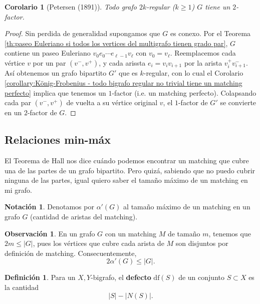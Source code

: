 \documentclass[12pt]{report}
\theoremstyle{plain}
\newtheorem{corollary}[theorem]{Corolario}
\theoremstyle{definition}
\newtheorem{definition}[theorem]{Definición}
\newtheorem{obs}[theorem]{Observación}
\newtheorem{notation}[theorem]{Notación}
\newcommand{\abs}[1]{\left \vert #1 \right \vert}
\newcommand{\defecto}[1]{\mathrm{df}(#1)}
\begin{document}
\begin{corollary}[Petersen (1891)]
Todo grafo $2k$-regular ($k \geq 1$) $G$ tiene un $2$-factor.
\end{corollary}
\begin{proof}
Sin perdida de generalidad supongamos que $G$ es conexo. Por el Teorema \ref{th:paseo Euleriano si todos los vertices del multigrafo tienen grado par}, $G$ contiene un paseo Euleriano $v_0 e_0 \cdots e_{\ell -1} v_\ell$ con $v_0 = v_\ell$. Reemplacemos cada vértice $v$ por un par $(v^- , v^+)$, y cada arissta $e_i = v_i v_{i+1}$ por la arista $v_i^+ v_{i+1}^-$. Así obtenemos un grafo bipartito $G'$ que es $k$-regular, con lo cual el Corolario \ref{corollary:König-Frobenius - todo bigrafo regular no trivial tiene un matching perfecto} implica que tenemos un $1$-factor (i.e. un matching perfecto). Colapsando cada par $(v^-,v^+)$ de vuelta a su vértice original $v$, el $1$-factor de $G'$ se convierte en un $2$-factor de $G$.

\end{proof}

\subsection{Relaciones min-máx}

El Teorema de Hall nos dice cuándo podemos encontrar un matching que cubre una de las partes de un grafo bipartito.
Pero quizá, sabiendo que no puedo cubrir ninguna de las partes, igual quiero saber el tamaño máximo de un matching en
mi grafo.

\begin{notation}
Denotamos por $\alpha ' (G)$ al tamaño máximo de un matching en un grafo $G$ (cantidad de aristas del matching).
\end{notation}

\begin{obs}
En un grafo $G$ con un matching $M$ de tamaño $m$, tenemos que $2 m \leq \abs G$, pues los vértices que cubre cada arista de $M$ son disjuntos por definición de matching. Consecuentemente,
\[
    2 \alpha ' (G) \leq \abs G.
\]
\end{obs}

\begin{definition}
Para un $X,Y$-bigrafo, el \textbf{defecto} $\defecto{S}$ de un conjunto $S \subset X$ es la cantidad
\[
    \abs S - \abs{N(S)}.
\]
\end{definition}
\end{document}
